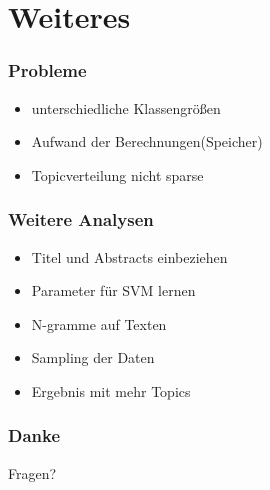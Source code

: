 \documentclass[12pt, xcolor=table]{beamer}
\begin{document}


\section{Weiteres} %
\label{sec:Weiteres}

\begin{frame}
    \frametitle{Probleme}
    \begin{itemize}
        \item unterschiedliche Klassengrößen
        \item Aufwand der Berechnungen(Speicher)
        \item Topicverteilung nicht sparse
    \end{itemize}
\end{frame}

\begin{frame}
    \frametitle{Weitere Analysen}
    \begin{itemize}
        \item Titel und Abstracts einbeziehen
        \item Parameter für SVM lernen
        \item N-gramme auf Texten
        \item Sampling der Daten
        \item Ergebnis mit mehr Topics
    \end{itemize}
\end{frame}

\begin{frame}
    \frametitle{Danke}
    \begin{block}{Fragen?}
    \end{block}
\end{frame}
\end{document}
